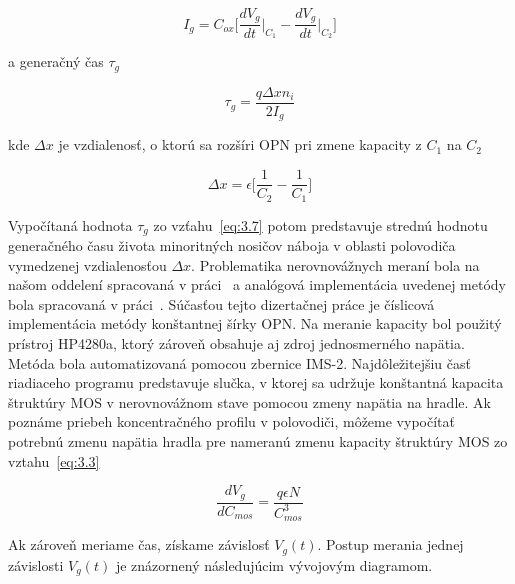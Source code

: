 \begin{equation}\label{eq:3.6}
  I_g = C_{ox} \bigg[\frac{dV_g}{dt}\Big\rvert_{C_1} - \frac{dV_g}{dt}\Big\rvert_{C_2}\bigg]
\end{equation}

a generačný čas $\tau_g$

\begin{equation}\label{eq:3.7}
  \tau_g = \frac{q\Delta x n_i}{2I_g}
\end{equation}

kde $\Delta x$ je vzdialenosť, o ktorú sa rozšíri OPN pri zmene
kapacity z $C_1$ na $C_2$

\begin{equation}\label{eq:3.8}
  \Delta x = \epsilon \Big[\frac{1}{C_2} - \frac{1}{C_1}\Big]
\end{equation}

Vypočítaná hodnota $\tau_g$ zo vzťahu~\ref{eq:3.7} potom predstavuje
strednú hodnotu generačného času života minoritných nosičov náboja v
oblasti polovodiča vymedzenej vzdialenosťou $\Delta x$.  Problematika
nerovnovážnych meraní bola na našom oddelení spracovaná v
práci~\cite{1.6} a analógová implementácia uvedenej metódy bola
spracovaná v práci~\cite{3.13}. Súčasťou tejto dizertačnej práce je
číslicová implementácia metódy konštantnej šírky OPN\@. Na meranie
kapacity bol použitý prístroj HP4280a, ktorý zároveň obsahuje aj zdroj
jednosmerného napätia. Metóda bola automatizovaná pomocou zbernice
IMS-2. Najdôležitejšiu časť riadiaceho programu predstavuje slučka, v
ktorej sa udržuje konštantná kapacita štruktúry MOS v nerovnovážnom
stave pomocou zmeny napätia na hradle.  Ak poznáme priebeh
koncentračného profilu v polovodiči, môžeme vypočítať potrebnú zmenu
napätia hradla pre nameranú zmenu kapacity štruktúry MOS zo
vztahu~\ref{eq:3.3}

\begin{equation}\label{eq:3.9}
  \frac{dV_g}{dC_{mos}} = \frac{q\epsilon N}{C^3_{mos}}
\end{equation}

Ak zároveň meriame čas, získame závislosť $V_g(t)$. Postup merania
jednej závislosti $V_g(t)$ je znázornený následujúcim vývojovým
diagramom.

